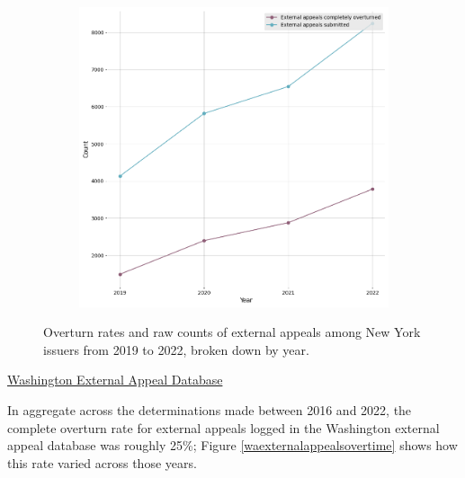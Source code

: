 \documentclass[12pt, a4paper,twoside]{report}
\theoremstyle{plain} %
\theoremstyle{definition} %
\theoremstyle{remark} %
\numberwithin{equation}{chapter}
\begin{document}
\begin{figure}[h!]
\begin{subfigure}[b]{0.49\textwidth}
				\includegraphics[width=\textwidth]{images/nys_external/external_appeals_by_year.png}
			\end{subfigure}
			\caption{Overturn rates and raw counts of external appeals among New York issuers from 2019 to 2022, broken down by year.}
			\label{nyexternalappealsovertime}
		\end{figure}
	
		\underline{Washington External Appeal Database}

		In aggregate across the determinations made between 2016 and 2022, the complete overturn rate for external appeals logged in the Washington external appeal database was roughly 25\%; Figure \ref{waexternalappealsovertime} shows how this rate varied across those years.
		
\end{document}
